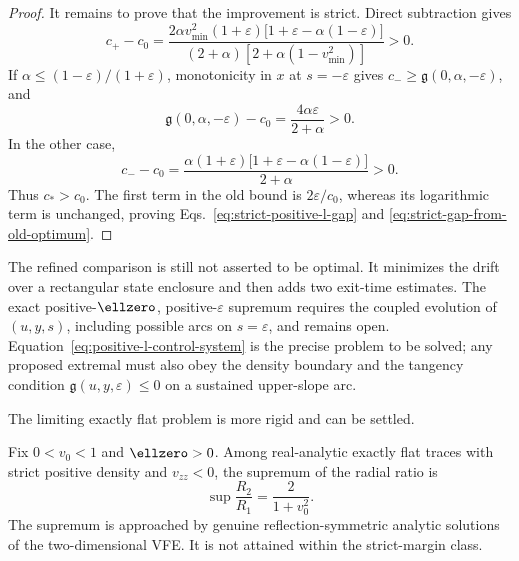 \begin{proof}
It remains to prove that the improvement is strict. Direct subtraction
gives
\begin{equation}
c_+-c_0=
\frac{2\alpha v_{\mathrm{min}}^2(1+\varepsilon)
\bigl[1+\varepsilon-\alpha(1-\varepsilon)\bigr]}
{(2+\alpha)[2+\alpha(1-v_{\mathrm{min}}^2)]}>0.
\label{eq:c-plus-strict-difference}
\end{equation}
If
$\alpha\leqslant(1-\varepsilon)/(1+\varepsilon)$, monotonicity in $x$
at $s=-\varepsilon$ gives
$c_-\geqslant\mathfrak g(0,\alpha,-\varepsilon)$, and
\begin{equation}
\mathfrak g(0,\alpha,-\varepsilon)-c_0
=\frac{4\alpha\varepsilon}{2+\alpha}>0.
\label{eq:c-minus-first-strict-difference}
\end{equation}
In the other case,
\begin{equation}
c_--c_0=
\frac{\alpha(1+\varepsilon)
\bigl[1+\varepsilon-\alpha(1-\varepsilon)\bigr]}
{2+\alpha}>0.
\label{eq:c-minus-second-strict-difference}
\end{equation}
Thus $c_*>c_0$. The first term in the old bound is
$2\varepsilon/c_0$, whereas its logarithmic term is unchanged, proving
Eqs.~\eqref{eq:strict-positive-l-gap} and
\eqref{eq:strict-gap-from-old-optimum}.
\end{proof}

The refined comparison is still not asserted to be optimal. It minimizes
the drift over a rectangular state enclosure and then adds two exit-time
estimates. The exact positive-$\ellzero$, positive-$\varepsilon$ supremum
requires the coupled evolution of $(u,y,s)$, including possible arcs on
$s=\varepsilon$, and remains open. Equation~\eqref{eq:positive-l-control-system}
is the precise problem to be solved; any proposed extremal must also obey
the density boundary and the tangency condition
$\mathfrak g(u,y,\varepsilon)\leqslant0$ on a sustained upper-slope arc.

The limiting exactly flat problem is more rigid and can be settled.

\begin{proposition}
\label{prop:sharp-positive-l-exact-flat-limit}
Fix $0<v_0<1$ and $\ellzero>0$. Among real-analytic exactly flat traces
with strict positive density and $v_{zz}<0$, the supremum of the radial
ratio is
\begin{equation}
\sup\frac{R_2}{R_1}=\frac{2}{1+v_0^2}.
\label{eq:positive-l-exact-flat-supremum}
\end{equation}
The supremum is approached by genuine reflection-symmetric analytic
solutions of the two-dimensional VFE. It is not attained within the
strict-margin class.
\end{proposition}

